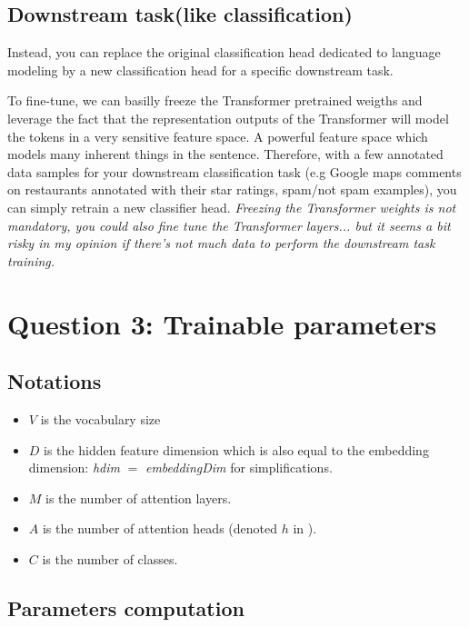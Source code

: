 \documentclass[a4paper]{article}
\begin{document}
\subsection*{Downstream task(like classification)}
Instead, you can replace the original classification head dedicated to language modeling by a new classification head for a specific downstream task. 

To fine-tune, we can basilly freeze the Transformer \cite{vaswani2017} pretrained weigths and leverage the fact that the representation outputs of the Transformer \cite{vaswani2017}
will model the tokens in a very sensitive feature space. A powerful feature space which models many inherent things in the sentence.
Therefore, with a few annotated data samples for your downstream classification task (e.g Google maps comments on restaurants annotated with their star ratings, spam/not spam examples), you can simply retrain a new classifier head.
\textit{Freezing the Transformer \cite{vaswani2017} weights is not mandatory, you could also fine tune the Transformer \cite{vaswani2017} layers... but it seems a bit risky in my opinion if there's not much data
to perform the downstream task training.} 

\pagebreak
\section{Question 3: Trainable parameters}

\subsection*{Notations}


\begin{itemize}
    \item $V$ is the vocabulary size
    \item $D$ is the hidden feature dimension which is also equal to the embedding dimension: \textit{hdim} $=$ \textit{embeddingDim} for simplifications.
    \item $M$ is the number of attention layers.
    \item $A$ is the number of attention heads (denoted $h$ in \cite{vaswani2017}).
    \item $C$ is the number of classes.
\end{itemize}

\subsection*{Parameters computation}
\end{document}
